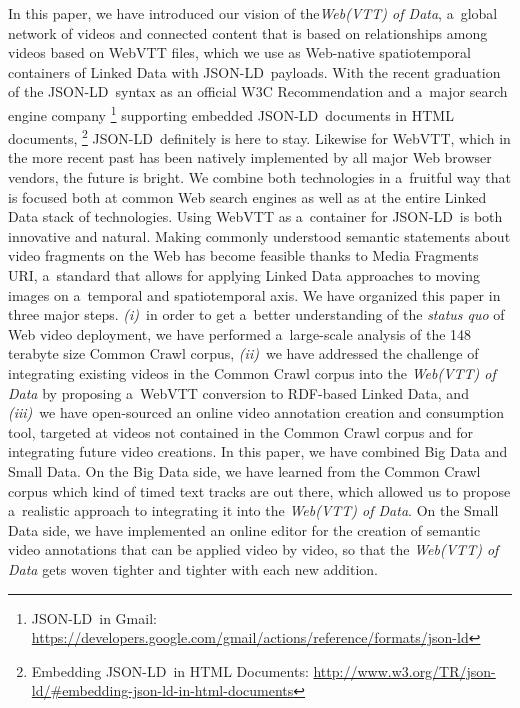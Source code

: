 \documentclass{sig-alternate}
\newcommand{\inlinelistingsize}{\fontsize{8pt}{11pt}}
\let\oldurl\url
\renewcommand{\url}[1]{\inlinelistingsize\oldurl{#1}}
\def\JSONLD{\mbox{JSON-LD}}
\begin{document}
In this paper, we have introduced our vision of the\linebreak \emph{Web(VTT) of Data},
a~global network of videos and connected content
that is based on relationships among videos based on WebVTT files,
which we use as Web-native spatiotemporal containers of Linked Data
with \JSONLD\ payloads.
With the recent graduation of the \JSONLD\ syntax
as an official W3C Recommendation and a~major search engine company%
\footnote{\JSONLD\ in Gmail:
\url{https://developers.google.com/gmail/actions/reference/formats/json-ld}}
supporting embedded \JSONLD\ documents in HTML documents,%
\footnote{Embedding \JSONLD\ in HTML Documents:
\url{http://www.w3.org/TR/json-ld/\#embedding-json-ld-in-html-documents}}
\JSONLD\ definitely is here to stay.
Likewise for WebVTT, which in the more recent past has been natively implemented
by all major Web browser vendors,
the future is bright.
We combine both technologies in a~fruitful way that is focused
both at common Web search engines
as well as at the entire Linked Data stack of technologies.
Using WebVTT as a~container for \JSONLD\ is both innovative and natural.
Making commonly understood semantic statements about video fragments on the Web
has become feasible thanks to Media Fragments URI,
a~standard that allows for applying Linked Data approaches to moving images
on a~temporal and spatiotemporal axis.
We have organized this paper in three major steps.
\emph{(i)}~in order to get a~better understanding of the \emph{status quo}
of Web video deployment, we have performed a~large-scale analysis
of the 148 terabyte size Common Crawl corpus,
\emph{(ii)}~we have addressed the challenge of integrating
existing videos in the Common Crawl corpus into the \emph{Web(VTT) of Data}
by proposing a~WebVTT conversion to RDF-based Linked Data,
and \emph{(iii)}~we have open-sourced an online video annotation creation
and consumption tool, targeted at videos not contained in the Common Crawl corpus
and for integrating future video creations.
In this paper, we have combined Big Data and Small Data.
On the Big Data side, we have learned from the Common Crawl corpus
which kind of timed text tracks are out there,
which allowed us to propose a~realistic approach to integrating it
into the \emph{Web(VTT) of Data}.
On the Small Data side, we have implemented an online editor for the creation
of semantic video annotations that can be applied video by video,
so that the \emph{Web(VTT) of Data} gets woven tighter and tighter with each new addition.
\end{document}
